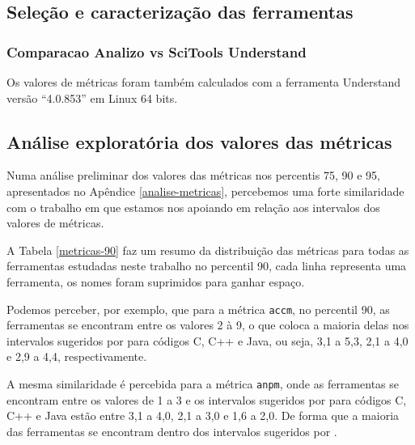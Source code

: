  \label{conclusoes}

\subsection{Seleção e caracterização das ferramentas}

\subsubsection{Comparacao Analizo vs SciTools Understand}

Os valores de métricas foram também calculados com a ferramenta Understand
versão ``4.0.853'' em Linux 64 bits.

\subsection{Análise exploratória dos valores das métricas}

Numa análise preliminar dos valores das métricas nos percentis 75, 90 e 95,
apresentados no Apêndice \ref{analise-metricas}, percebemos uma forte
similaridade com o trabalho em que estamos nos apoiando \cite{Meirelles2013}
em relação aos intervalos dos valores de métricas.

A Tabela \ref{metricas-90} faz um resumo da distribuição das métricas para todas
as ferramentas estudadas neste trabalho no
percentil 90, cada linha
representa uma ferramenta, os nomes foram suprimidos para ganhar
espaço.


Podemos perceber, por exemplo, que para a métrica \texttt{accm}, no percentil 90,
as ferramentas se encontram entre os valores 2 à 9, o que coloca a maioria
delas nos intervalos sugeridos por \cite{Meirelles2013} para
códigos C, C++ e Java, ou seja, 3,1 a 5,3, 2,1 a 4,0 e 2,9 a 4,4,
respectivamente.

A mesma similaridade é percebida para a métrica \texttt{anpm}, onde as
ferramentas se encontram entre os valores de 1 a 3 e os intervalos sugeridos por
\cite{Meirelles2013} para códigos C, C++ e Java estão entre 3,1 a 4,0, 2,1 a
3,0 e 1,6 a 2,0. De forma que a maioria das ferramentas se encontram dentro
dos intervalos sugeridos por \cite{Meirelles2013}.

